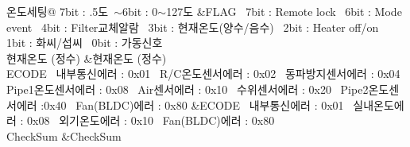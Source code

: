 \begin{DoxyItemize}
\begin{longtabu}
온도세팅@ 7bit \+: .5도~$\sim$6bit \+: 0$\sim$127도  &F\+L\+AG~\newline
 7bit \+: Remote lock~\newline
 6bit \+: Mode event~\newline
 4bit \+: Filter교체알람~\newline
 3bit \+: 현재온도(양수/음수)~\newline
 2bit \+: Heater off/on~\newline
 1bit \+: 화씨/섭씨~\newline
 0bit \+: 가동신호   \\
현재온도 (정수)  &현재온도 (정수)   \\
E\+C\+O\+DE~\newline
 내부통신에러 \+: 0x01~\newline
 R/\+C온도센서에러 \+: 0x02~\newline
 동파방지센서에러 \+: 0x04~\newline
 Pipe1온도센서에러 \+: 0x08~\newline
 Air센서에러 \+: 0x10~\newline
 수위센서에러 \+: 0x20~\newline
 Pipe2온도센서에러 \+:0x40~\newline
 Fan(\+B\+L\+D\+C)에러 \+: 0x80  &E\+C\+O\+DE~\newline
 내부통신에러 \+: 0x01~\newline
 실내온도에러 \+: 0x08~\newline
 외기온도에러 \+: 0x10~\newline
 Fan(\+B\+L\+D\+C)에러 \+: 0x80   \\
Check\+Sum  &Check\+Sum   \\
\end{longtabu}
\end{DoxyItemize}
